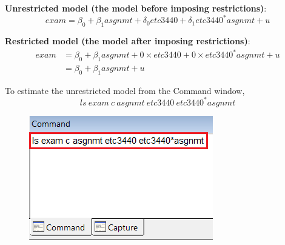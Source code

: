 \documentclass[12pt]{report}
\begin{document}
\noindent \noindent \textbf{Unrestricted model (the model before imposing restrictions)}:
$$exam = \beta_0 + \beta_1asgnmt + \delta_0etc3440 + \delta_1etc3440^*asgnmt + u$$

\noindent \textbf{Restricted model (the model after imposing restrictions)}:
\begin{align*}
	exam &= \beta_0 + \beta_1asgnmt + 0\times etc3440 + 0\times etc3440^*asgnmt + u \\
	&= \beta_0 + \beta_1asgnmt + u
\end{align*}

\noindent To estimate the unrestricted model from the Command window,
$$ls\ exam\ c\ asgnmt\ etc3440\ etc3440^*asgnmt$$
\begin{figure}[H]
	\centering
	\includegraphics{q1_24}
\end{figure}
\vspace{-\baselineskip}
\end{document}

